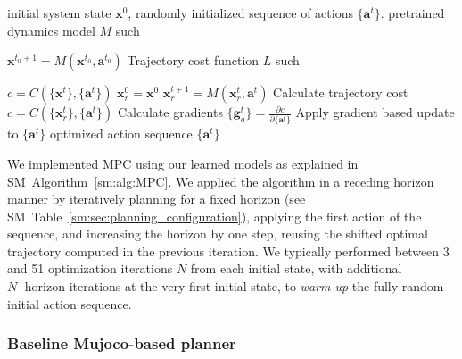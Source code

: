 \begin{algorithm}[tb]
   \caption{MPC algorithm}
   \label{sm:alg:MPC}
\begin{algorithmic}
    initial system state $\textbf{x}^{0}$,
    randomly initialized sequence of actions $\{\textbf{a}^{t}\}$.
    pretrained dynamics model $M$ such
   
   $\textbf{x}^{t_0+1} = M(\textbf{x}^{t_0}, \textbf{a}^{t_0})$
     Trajectory cost function $L$ such
   
   $c = C(\{\textbf{x}^{t}\}, \{\textbf{a}^{t}\})$
   \STATE $\textbf{x}^{0}_r=\textbf{x}^{0}$
     \STATE $\textbf{x}^{t+1}_r=M(\textbf{x}^{t}_r, \textbf{a}^{t})$
   \ENDFOR
   \STATE Calculate trajectory cost $c = C(\{\textbf{x}_r^{t}\}, \{\textbf{a}^{t}\})$
   \STATE Calculate gradients $\{\textbf{g}_a^{t}\} = \frac{\partial c}{\partial \{\textbf{a}^{t}\}}$
   \STATE Apply gradient based update to $\{\textbf{a}^{t}\}$
   \ENDFOR
    optimized action sequence $\{\textbf{a}^{t}\}$ 
\end{algorithmic}
\end{algorithm}

We implemented MPC using our learned models as explained in SM~Algorithm~\ref{sm:alg:MPC}. We applied the algorithm in a receding horizon manner by iteratively planning for a fixed horizon (see SM~Table~\ref{sm:sec:planning_configuration}), applying the first action of the sequence, and increasing the horizon by one step, reusing the shifted optimal trajectory computed in the previous iteration. We typically performed between 3 and 51 optimization iterations $N$ from each initial state, with additional $N\cdot \textrm{horizon}$ iterations at the very first initial state, to \emph{warm-up} the fully-random initial action sequence.


\subsubsection{Baseline Mujoco-based planner}
\label{sm:sec:planning_mujoco_baseline}

